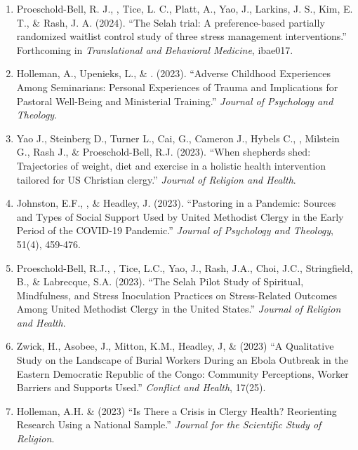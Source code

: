 \begin{enumerate}
\item Proeschold-Bell, R. J., \Eagle, Tice, L. C., Platt, A., Yao, J., Larkins, J. S., Kim, E. T., \& Rash, J. A. (2024). ``The Selah trial: A preference-based partially randomized waitlist control study of three stress management interventions.''  Forthcoming in \textit{Translational and Behavioral Medicine}, ibae017. 

\item Holleman, A., Upenieks, L., \& \Eagle. (2023). ``Adverse Childhood Experiences Among Seminarians: Personal Experiences of Trauma and Implications for Pastoral Well-Being and Ministerial Training.'' \textit{Journal of Psychology and Theology}. 

\item Yao J., Steinberg D., Turner L., Cai, G., Cameron J., Hybels C., \Eagle, Milstein G., Rash J., \& Proeschold-Bell, R.J. (2023). ``When shepherds shed: Trajectories of weight, diet and exercise in a holistic health intervention tailored for US Christian clergy.'' \textit{Journal of Religion and Health}. 

\item Johnston, E.F., \Eagle, \& Headley, J. (2023). ``Pastoring in a Pandemic: Sources and Types of Social Support Used by United Methodist Clergy in the Early Period of the COVID-19 Pandemic.'' \textit{Journal of Psychology and Theology}, 51(4), 459-476. 
	
\item Proeschold-Bell, R.J., \Eagle, Tice, L.C., Yao, J., Rash, J.A., Choi, J.C., Stringfield, B., \& Labrecque, S.A. (2023). ``The Selah Pilot Study of Spiritual, Mindfulness, and Stress Inoculation Practices on Stress-Related Outcomes Among United Methodist Clergy in the United States.'' \textit{Journal of Religion and Health}. 
	
\item Zwick, H., Asobee, J., Mitton, K.M., Headley, J, \& \Eagle\CS \hspace{0.1em} (2023) ``A Qualitative Study on the Landscape of Burial Workers During an Ebola Outbreak in the Eastern Democratic Republic of the Congo: Community Perceptions, Worker Barriers and Supports Used.''  \textit{Conflict and Health}, 17(25). 

\item Holleman, A.H. \& \Eagle\hspace{.01em} (2023) ``Is There a Crisis in Clergy Health? Reorienting Research Using a National Sample.'' \textit{Journal for the Scientific Study of Religion}. 


\end{enumerate}
